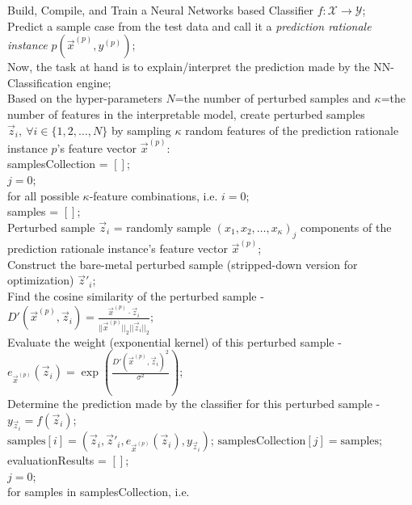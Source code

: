 \documentclass{article}
\begin{document}
\begin{algorithm}[H]
\SetAlgoLined
Build, Compile, and Train a Neural Networks based Classifier $f: \mathcal{X} \rightarrow \mathcal{Y}$;\\
Predict a sample case from the test data and call it a \textit{prediction rationale instance} $p(\vec{x}^{(p)}, y^{(p)})$;\\
Now, the task at hand is to explain/interpret the prediction made by the NN-Classification engine;\\
Based on the hyper-parameters $N$=the number of perturbed samples and $\kappa$=the number of features in the interpretable model, create perturbed samples $\vec{z}_i,\ \forall i \in \{1, 2, \dots, N\}$ by sampling $\kappa$ random features of the prediction rationale instance $p$'s feature vector $\vec{x}^{(p)}$:\\
samplesCollection = $[]$;\\
$j = 0$;\\
for all possible $\kappa$-feature combinations, i.e. 
{
    $i = 0$;\\
    samples = $[]$;\\
    {
        Perturbed sample $\vec{z}_i$ = randomly sample $(x_1, x_2, \dots, x_{\kappa})_j$ components of the prediction rationale instance's feature vector $\vec{x}^{(p)}$;\\
        Construct the bare-metal perturbed sample (stripped-down version for optimization) $\vec{z}'_i$;\\
        Find the cosine similarity of the perturbed sample - \\
        $D'(\vec{x}^{(p)}, \vec{z}_i) = \frac{\vec{x}^{(p)} \cdot \vec{z}_i}{||\vec{x}^{(p)}||_2 ||\vec{z}_i||_2}$;\\
        Evaluate the weight (exponential kernel) of this perturbed sample - \\
        $e_{\vec{x}^{(p)}}(\vec{z}_i) = \exp({\frac{D'(\vec{x}^{(p)}, \vec{z}_i)^2}{\sigma^2}})$;\\
        Determine the prediction made by the classifier for this perturbed sample - $y_{\vec{z}_i} = f(\vec{z}_i)$;\\
        $\text{samples}[i] = (\vec{z}_i, \vec{z}'_i, e_{\vec{x}^{(p)}}(\vec{z}_i), y_{\vec{z}_i})$;
    }
    $\text{samplesCollection}[j] = \text{samples}$;\\
}
evaluationResults = $[]$;\\
$j = 0$;\\
for samples in samplesCollection, i.e. 

\end{algorithm}
\end{document}
